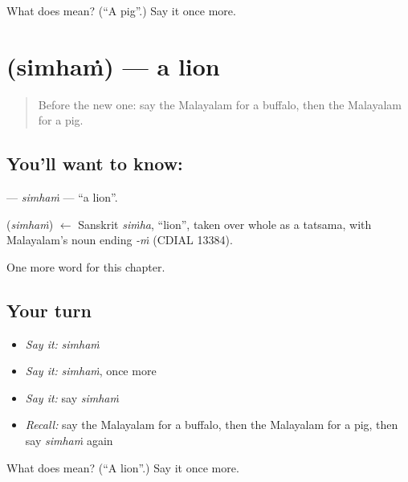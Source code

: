 \begin{tcolorbox}[breakable,colback=teal!4,colframe=teal!35!black,title={Before you move on}]
What does  mean? (\textquotedblleft{}A pig\textquotedblright{}.) Say it once more.
\end{tcolorbox}
\section[\texorpdfstring{\ml{സിംഹം} (simhaṁ)}{സിംഹം (simhaṁ)}]{ (simhaṁ) — a lion}

\label{lesson:ML-C151-simham}



\begin{quote}
Before the new one: say the Malayalam for a buffalo, then the Malayalam for a pig.
\end{quote}

\subsection*{You'll want to know: }
\textbf{} — \emph{simhaṁ} — \textquotedblleft{}a lion\textquotedblright{}.

\begin{cousinweb}
\textbf{} (\emph{simhaṁ}) $\leftarrow$ Sanskrit \emph{siṁha}, \textquotedblleft{}lion\textquotedblright{}, taken over whole as a tatsama, with Malayalam's noun ending \emph{-ṁ} (CDIAL 13384).
\end{cousinweb}

\begin{grammarlens}[title={What you've built}]
One more word for this chapter.
\end{grammarlens}

\subsection*{Your turn}
\begin{itemize}
\raggedright
  \item \emph{Say it:} \emph{simhaṁ}
  \item \emph{Say it:} \emph{simhaṁ}, once more
  \item \emph{Say it:} say \emph{simhaṁ}
  \item \emph{Recall:} say the Malayalam for a buffalo, then the Malayalam for a pig, then say \emph{simhaṁ} again
\end{itemize}

\begin{tcolorbox}[breakable,colback=teal!4,colframe=teal!35!black,title={Before you move on}]
What does  mean? (\textquotedblleft{}A lion\textquotedblright{}.) Say it once more.
\end{tcolorbox}
